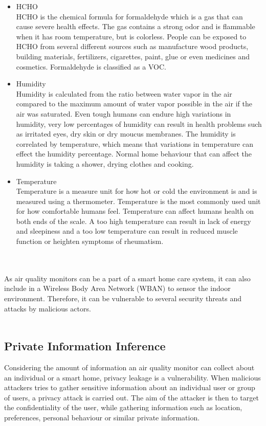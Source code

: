 \begin{itemize}
     \item HCHO\\
        HCHO is the chemical formula for formaldehyde which is a gas that can cause severe health effects. \cite{HCHO} The gas contains a strong odor and is flammable when it has room temperature, but is colorless. People can be exposed to HCHO from several different sources such as manufacture wood products, building materials, fertilizers, cigarettes, paint, glue or even medicines and cosmetics. Formaldehyde is classified as a VOC.
    \item Humidity\\
        Humidity is calculated from the ratio between water vapor in the air compared to the maximum amount of water vapor possible in the air if the air was saturated. \cite{RecommendedIAQ} Even tough humans can endure high variations in humidity, very low percentages of humidity can result in health problems such as irritated eyes, dry skin or dry moucus membranes. The humidity is correlated by temperature, which means that variations in temperature can effect the humidity percentage. Normal home behaviour that can affect the humidity is taking a shower, drying clothes and cooking. 
    \item Temperature\\
        Temperature is a measure unit for how hot or cold the environment is and is measured using a thermometer. Temperature is the most commonly used unit for how comfortable humans feel. Temperature can affect humans health on both ends of the scale. A too high temperature can result in lack of energy and sleepiness and a too low temperature can result in reduced muscle function or heighten symptoms of rheumatism. \cite{Temp}
\end{itemize}


\\\\
As air quality monitors can be a part of a smart home care system, it can also include in a Wireless Body Area Network (WBAN) to sensor the indoor environment. Therefore, it can be vulnerable to several security threats and attacks by malicious actors. \cite{AttackstoAQMs} 
\\\\

\subsection*{Private Information Inference}
Considering the amount of information an air quality monitor can collect about an individual or a smart home, privacy leakage is a vulnerability. \cite{SecPrivSmartCity} When malicious attackers tries to gather sensitive information about an individual user or group of users, a privacy attack is carried out. \cite{CyberEntitySecInIoT} The aim of the attacker is then to target the confidentiality of the user, while gathering information such as location, preferences, personal behaviour or similar private information.

